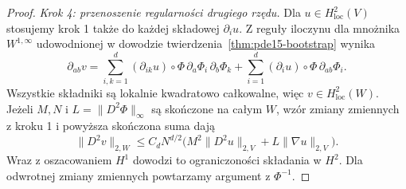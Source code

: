 \begin{proof}
\emph{Krok 4: przenoszenie regularności drugiego rzędu.}
Dla $u\in H^2_{\mathrm{loc}}(V)$ stosujemy krok 1
także do każdej składowej $\partial_i u$. Z reguły
iloczynu dla mnożnika $W^{1,\infty}$ udowodnionej
w dowodzie twierdzenia~\ref{thm:pde15-bootstrap} wynika
\[
 \partial_{ab}v
 =\sum_{i,k=1}^d(\partial_{ik}u)\circ\Phi\,
       \partial_a\Phi_i\,\partial_b\Phi_k
   +\sum_{i=1}^d(\partial_i u)\circ\Phi\,\partial_{ab}\Phi_i.
\]
Wszystkie składniki są lokalnie kwadratowo całkowalne,
więc $v\in H^2_{\mathrm{loc}}(W)$.
Jeżeli $M,N$ i $L=\|D^2\Phi\|_\infty$ są skończone
na całym $W$, wzór zmiany zmiennych z kroku 1
i powyższa skończona suma dają
\[
 \|D^2 v\|_{2,W}
 \le C_d N^{d/2}
      \bigl(M^2\|D^2u\|_{2,V}+L\|\nabla u\|_{2,V}\bigr).
\]
Wraz z oszacowaniem $H^1$ dowodzi to ograniczoności
składania w $H^2$. Dla odwrotnej zmiany zmiennych
powtarzamy argument z $\Phi^{-1}$.
\end{proof}

